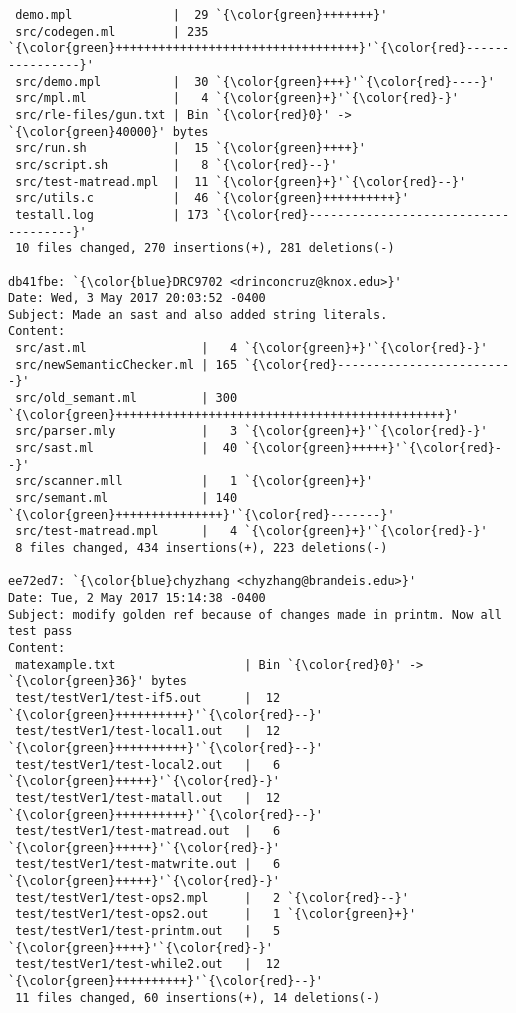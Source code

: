 \begin{lstlisting}
 demo.mpl              |  29 `{\color{green}+++++++}'
 src/codegen.ml        | 235 `{\color{green}++++++++++++++++++++++++++++++++++}'`{\color{red}----------------}'
 src/demo.mpl          |  30 `{\color{green}+++}'`{\color{red}----}'
 src/mpl.ml            |   4 `{\color{green}+}'`{\color{red}-}'
 src/rle-files/gun.txt | Bin `{\color{red}0}' -> `{\color{green}40000}' bytes
 src/run.sh            |  15 `{\color{green}++++}'
 src/script.sh         |   8 `{\color{red}--}'
 src/test-matread.mpl  |  11 `{\color{green}+}'`{\color{red}--}'
 src/utils.c           |  46 `{\color{green}++++++++++}'
 testall.log           | 173 `{\color{red}-------------------------------------}'
 10 files changed, 270 insertions(+), 281 deletions(-)

db41fbe: `{\color{blue}DRC9702 <drinconcruz@knox.edu>}'
Date: Wed, 3 May 2017 20:03:52 -0400
Subject: Made an sast and also added string literals.
Content: 
 src/ast.ml                |   4 `{\color{green}+}'`{\color{red}-}'
 src/newSemanticChecker.ml | 165 `{\color{red}-------------------------}'
 src/old_semant.ml         | 300 `{\color{green}++++++++++++++++++++++++++++++++++++++++++++++}'
 src/parser.mly            |   3 `{\color{green}+}'`{\color{red}-}'
 src/sast.ml               |  40 `{\color{green}+++++}'`{\color{red}--}'
 src/scanner.mll           |   1 `{\color{green}+}'
 src/semant.ml             | 140 `{\color{green}+++++++++++++++}'`{\color{red}-------}'
 src/test-matread.mpl      |   4 `{\color{green}+}'`{\color{red}-}'
 8 files changed, 434 insertions(+), 223 deletions(-)

ee72ed7: `{\color{blue}chyzhang <chyzhang@brandeis.edu>}'
Date: Tue, 2 May 2017 15:14:38 -0400
Subject: modify golden ref because of changes made in printm. Now all test pass
Content: 
 matexample.txt                  | Bin `{\color{red}0}' -> `{\color{green}36}' bytes
 test/testVer1/test-if5.out      |  12 `{\color{green}++++++++++}'`{\color{red}--}'
 test/testVer1/test-local1.out   |  12 `{\color{green}++++++++++}'`{\color{red}--}'
 test/testVer1/test-local2.out   |   6 `{\color{green}+++++}'`{\color{red}-}'
 test/testVer1/test-matall.out   |  12 `{\color{green}++++++++++}'`{\color{red}--}'
 test/testVer1/test-matread.out  |   6 `{\color{green}+++++}'`{\color{red}-}'
 test/testVer1/test-matwrite.out |   6 `{\color{green}+++++}'`{\color{red}-}'
 test/testVer1/test-ops2.mpl     |   2 `{\color{red}--}'
 test/testVer1/test-ops2.out     |   1 `{\color{green}+}'
 test/testVer1/test-printm.out   |   5 `{\color{green}++++}'`{\color{red}-}'
 test/testVer1/test-while2.out   |  12 `{\color{green}++++++++++}'`{\color{red}--}'
 11 files changed, 60 insertions(+), 14 deletions(-)


\end{lstlisting}
